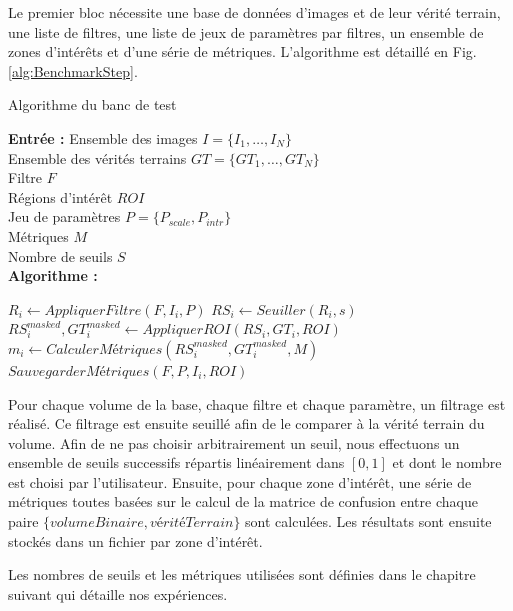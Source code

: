 Le premier bloc nécessite une base de données d'images et de leur vérité terrain, une liste de filtres, une liste de jeux de paramètres par filtres, un ensemble de zones d'intérêts et d'une série de métriques. L'algorithme est détaillé en Fig. \ref{alg:BenchmarkStep}.

\begin{algorithm}[!ht]
  \caption{Algorithme du banc de test}\label{alg:BenchmarkStep}
      \textbf{Entrée :}
      Ensemble des images $I=\{I_1,\ldots,I_N\}$ \\
      Ensemble des vérités terrains $GT=\{GT_1,\ldots,GT_N\}$\\
      Filtre $F$\\
      Régions d'intérêt $ROI$\\
      Jeu de paramètres  $P=\{ P_{scale},P_{intr} \} $\\ 
      Métriques $M$\\
      Nombre de seuils $S$ \\
      \textbf{Algorithme :}
      \begin{algorithmic}
              \State $R_{i} \gets AppliquerFiltre(F,I_i,P)$
                \State $RS_{i} \gets Seuiller(R_{i},s)$
                \State $RS_{i}^{masked},GT_{i}^{masked} \gets AppliquerROI( RS_{i},GT_{i}, ROI ) $
                \State $m_{i} \gets CalculerMétriques(RS_{i}^{masked}, GT_{i}^{masked}, M)$
                \State $SauvegarderMétriques(F,P,I_i,ROI)$
              \EndFor
          \EndFor
      \end{algorithmic}
  \end{algorithm}

Pour chaque volume de la base, chaque filtre et chaque paramètre, un filtrage est réalisé. Ce filtrage est ensuite seuillé afin de le comparer à la vérité terrain du volume. Afin de ne pas choisir arbitrairement un seuil, nous effectuons un ensemble de seuils successifs répartis linéairement dans $[0,1]$ et dont le nombre est choisi par l'utilisateur. Ensuite, pour chaque zone d'intérêt, une série de métriques toutes basées sur le calcul de la matrice de confusion entre chaque paire $\{volume Binaire, vérité Terrain\}$ sont calculées. Les résultats sont ensuite stockés dans un fichier par zone d'intérêt.

Les nombres de seuils et les métriques utilisées sont définies dans le chapitre suivant qui détaille nos expériences. 


